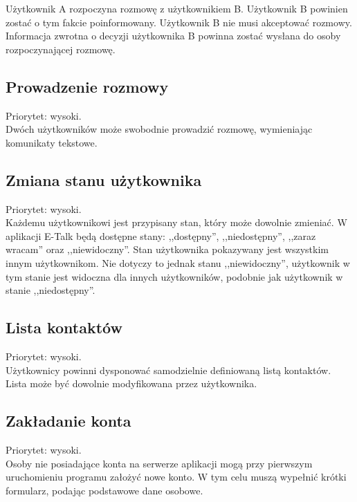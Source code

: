 \documentclass[a4paper,12pt]{article}
\begin{document}
Użytkownik A rozpoczyna rozmowę z użytkownikiem B. Użytkownik B powinien zostać o tym fakcie poinformowany. Użytkownik B nie musi akceptować rozmowy. Informacja zwrotna o decyzji użytkownika B powinna zostać wysłana do osoby rozpoczynającej rozmowę.

\subsection[Prowadzenie rozmowy]{Prowadzenie rozmowy}

Priorytet: wysoki.\\

Dwóch użytkowników może swobodnie prowadzić rozmowę, wymieniając komunikaty tekstowe.

\subsection[Zmiana stanu użytkownika]{Zmiana stanu użytkownika}

Priorytet: wysoki.\\

Każdemu użytkownikowi jest przypisany stan, który może dowolnie zmieniać. W aplikacji E-Talk będą dostępne stany: ,,dostępny'', ,,niedostępny'', ,,zaraz wracam'' oraz ,,niewidoczny''. Stan użytkownika pokazywany jest wszystkim innym użytkownikom. Nie dotyczy to jednak stanu ,,niewidoczny'', użytkownik w tym stanie jest widoczna dla innych użytkowników, podobnie jak użytkownik w stanie ,,niedostępny''.

\subsection[Lista kontaktów]{Lista kontaktów}

Priorytet: wysoki.\\

Użytkownicy powinni dysponować samodzielnie definiowaną listą kontaktów. Lista może być dowolnie modyfikowana przez użytkownika.

\subsection[Zakładanie konta]{Zakładanie konta}

Priorytet: wysoki.\\

Osoby nie posiadające konta na serwerze aplikacji mogą przy pierwszym uruchomieniu programu założyć nowe konto. W tym celu muszą wypełnić krótki formularz, podając podstawowe dane osobowe.
\end{document}
